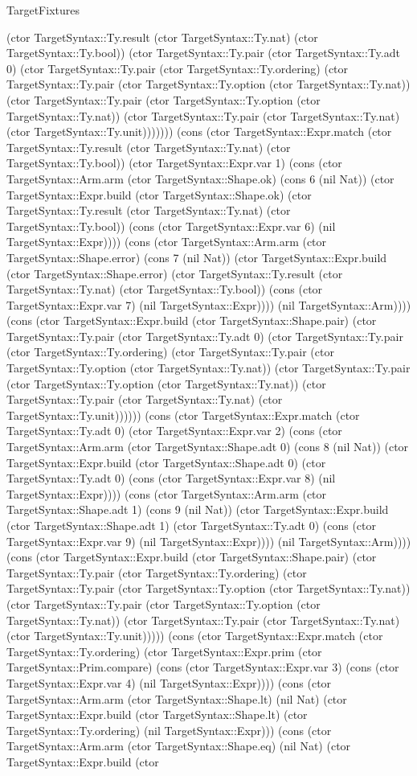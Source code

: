 \begin{lexlean}{TargetFixtures}
\begin{semanticmodule}
{(ctor TargetSyntax::Ty.result (ctor TargetSyntax::Ty.nat) (ctor TargetSyntax::Ty.bool)) (ctor TargetSyntax::Ty.pair (ctor TargetSyntax::Ty.adt 0) (ctor TargetSyntax::Ty.pair (ctor TargetSyntax::Ty.ordering) (ctor TargetSyntax::Ty.pair (ctor TargetSyntax::Ty.option (ctor TargetSyntax::Ty.nat)) (ctor TargetSyntax::Ty.pair (ctor TargetSyntax::Ty.option (ctor TargetSyntax::Ty.nat)) (ctor TargetSyntax::Ty.pair (ctor TargetSyntax::Ty.nat) (ctor TargetSyntax::Ty.unit))))))) (cons (ctor TargetSyntax::Expr.match (ctor TargetSyntax::Ty.result (ctor TargetSyntax::Ty.nat) (ctor TargetSyntax::Ty.bool)) (ctor TargetSyntax::Expr.var 1) (cons (ctor TargetSyntax::Arm.arm (ctor TargetSyntax::Shape.ok) (cons 6 (nil Nat)) (ctor TargetSyntax::Expr.build (ctor TargetSyntax::Shape.ok) (ctor TargetSyntax::Ty.result (ctor TargetSyntax::Ty.nat) (ctor TargetSyntax::Ty.bool)) (cons (ctor TargetSyntax::Expr.var 6) (nil TargetSyntax::Expr)))) (cons (ctor TargetSyntax::Arm.arm (ctor TargetSyntax::Shape.error) (cons 7 (nil Nat)) (ctor TargetSyntax::Expr.build (ctor TargetSyntax::Shape.error) (ctor TargetSyntax::Ty.result (ctor TargetSyntax::Ty.nat) (ctor TargetSyntax::Ty.bool)) (cons (ctor TargetSyntax::Expr.var 7) (nil TargetSyntax::Expr)))) (nil TargetSyntax::Arm)))) (cons (ctor TargetSyntax::Expr.build (ctor TargetSyntax::Shape.pair) (ctor TargetSyntax::Ty.pair (ctor TargetSyntax::Ty.adt 0) (ctor TargetSyntax::Ty.pair (ctor TargetSyntax::Ty.ordering) (ctor TargetSyntax::Ty.pair (ctor TargetSyntax::Ty.option (ctor TargetSyntax::Ty.nat)) (ctor TargetSyntax::Ty.pair (ctor TargetSyntax::Ty.option (ctor TargetSyntax::Ty.nat)) (ctor TargetSyntax::Ty.pair (ctor TargetSyntax::Ty.nat) (ctor TargetSyntax::Ty.unit)))))) (cons (ctor TargetSyntax::Expr.match (ctor TargetSyntax::Ty.adt 0) (ctor TargetSyntax::Expr.var 2) (cons (ctor TargetSyntax::Arm.arm (ctor TargetSyntax::Shape.adt 0) (cons 8 (nil Nat)) (ctor TargetSyntax::Expr.build (ctor TargetSyntax::Shape.adt 0) (ctor TargetSyntax::Ty.adt 0) (cons (ctor TargetSyntax::Expr.var 8) (nil TargetSyntax::Expr)))) (cons (ctor TargetSyntax::Arm.arm (ctor TargetSyntax::Shape.adt 1) (cons 9 (nil Nat)) (ctor TargetSyntax::Expr.build (ctor TargetSyntax::Shape.adt 1) (ctor TargetSyntax::Ty.adt 0) (cons (ctor TargetSyntax::Expr.var 9) (nil TargetSyntax::Expr)))) (nil TargetSyntax::Arm)))) (cons (ctor TargetSyntax::Expr.build (ctor TargetSyntax::Shape.pair) (ctor TargetSyntax::Ty.pair (ctor TargetSyntax::Ty.ordering) (ctor TargetSyntax::Ty.pair (ctor TargetSyntax::Ty.option (ctor TargetSyntax::Ty.nat)) (ctor TargetSyntax::Ty.pair (ctor TargetSyntax::Ty.option (ctor TargetSyntax::Ty.nat)) (ctor TargetSyntax::Ty.pair (ctor TargetSyntax::Ty.nat) (ctor TargetSyntax::Ty.unit))))) (cons (ctor TargetSyntax::Expr.match (ctor TargetSyntax::Ty.ordering) (ctor TargetSyntax::Expr.prim (ctor TargetSyntax::Prim.compare) (cons (ctor TargetSyntax::Expr.var 3) (cons (ctor TargetSyntax::Expr.var 4) (nil TargetSyntax::Expr)))) (cons (ctor TargetSyntax::Arm.arm (ctor TargetSyntax::Shape.lt) (nil Nat) (ctor TargetSyntax::Expr.build (ctor TargetSyntax::Shape.lt) (ctor TargetSyntax::Ty.ordering) (nil TargetSyntax::Expr))) (cons (ctor TargetSyntax::Arm.arm (ctor TargetSyntax::Shape.eq) (nil Nat) (ctor TargetSyntax::Expr.build (ctor }
\end{semanticmodule}
\end{lexlean}
